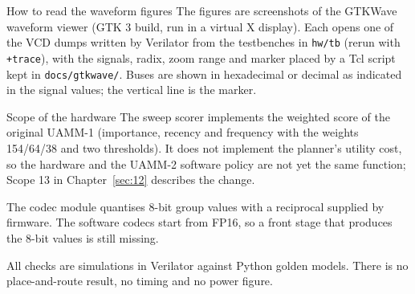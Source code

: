 \documentclass[12pt,a4paper]{report}
\begin{document}
\begin{calloutbox}{How to read the waveform figures}
The figures are screenshots of the GTKWave waveform viewer (GTK 3 build, run in a virtual X display). Each opens one of the VCD dumps written by Verilator from the testbenches in \texttt{hw/\allowbreak{}tb} (rerun with \texttt{+trace}), with the signals, radix, zoom range and marker placed by a Tcl script kept in \texttt{docs/\allowbreak{}gtkwave/\allowbreak{}}. Buses are shown in hexadecimal or decimal as indicated in the signal values; the vertical line is the marker.

\end{calloutbox}
\begin{calloutbox}{Scope of the hardware}
The sweep scorer implements the weighted score of the original UAMM-1 (importance, recency and frequency with the weights 154/64/38 and two thresholds). It does not implement the planner's utility cost, so the hardware and the UAMM-2 software policy are not yet the same function; Scope 13 in Chapter~\ref{sec:12} describes the change.

The codec module quantises 8-bit group values with a reciprocal supplied by firmware. The software codecs start from FP16, so a front stage that produces the 8-bit values is still missing.

All checks are simulations in Verilator against Python golden models. There is no place-and-route result, no timing and no power figure.

\end{calloutbox}
\end{document}
